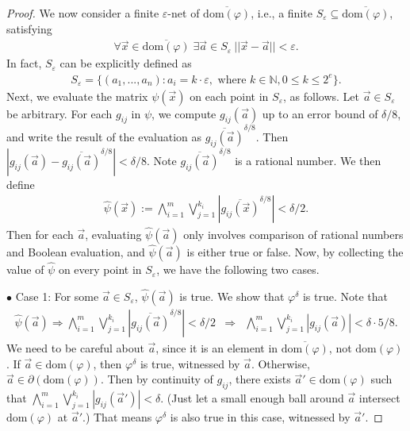 \documentclass[envcountsect]{llncs}
\newcommand{\dom}{\mathrm{dom}}
\begin{document}
\begin{proof}
We now consider a finite $\varepsilon$-net of $\overline{\dom(\varphi)}$, i.e., a finite $S_{\varepsilon} \subseteq \overline{\dom(\varphi)}$, satisfying
\begin{eqnarray}\label{two}
\forall \vec x\in \overline{\dom(\varphi)}\;\exists \vec a\in S_{\varepsilon}\ ||\vec x-\vec a||<\varepsilon. 
\end{eqnarray}
In fact, $S_{\varepsilon}$ can be explicitly defined as
\begin{eqnarray}\label{three}
S_{\varepsilon} = \{(a_1,...,a_n): a_i = k\cdot\varepsilon, \mbox{ where } k\in \mathbb{N}, 0\leq k\leq 2^e \}.
\end{eqnarray}
Next, we evaluate the matrix $\psi(\vec x)$ on each point in $S_{\varepsilon}$, as follows. Let $\vec a\in S_{\varepsilon}$ be arbitrary. For each $g_{ij}$ in $\psi$, we compute $g_{ij}(\vec a)$ up to an error bound of $\delta/8$, and write the result of the evaluation as $\overline{g_{ij}(\vec a)}^{\delta/8}$. Then $|g_{ij}(\vec a)- \overline{g_{ij}(\vec a)}^{\delta/8}|<{\delta}/{8}.$ Note $\overline{g_{ij}(\vec a)}^{\delta/8}$ is a rational number. We then define
\begin{eqnarray}
\widehat{\psi}(\vec x):= \bigwedge_{i=1}^m \bigvee_{j=1}^{k_i} |\overline{g_{ij}(\vec x)}^{\delta/8}|<\delta/2.
\end{eqnarray}
Then for each $\vec a$, evaluating $\widehat{\psi}(\vec a)$ only involves comparison of rational numbers and Boolean evaluation, and $\widehat{\psi}(\vec a)$ is either true or false. Now, by collecting the value of $\widehat{\psi}$ on every point in $S_{\varepsilon}$, we have the following two cases. 

$\bullet$ Case 1: For some $\vec a\in S_{\varepsilon}$, $\widehat{\psi}(\vec a)$ is true. We show that $\varphi^{\delta}$ is true. Note that
\begin{eqnarray*}
\widehat{\psi}(\vec a) \Rightarrow \bigwedge_{i=1}^m \bigvee_{j=1}^{k_i} |\overline{g_{ij}(\vec a)}^{\delta/8}|<\delta/2 
&\Rightarrow&\bigwedge_{i=1}^m \bigvee_{j=1}^{k_i} |g_{ij}(\vec a)|<\delta\cdot 5/8.
\end{eqnarray*}
We need to be careful about $\vec a$, since it is an element in $\overline{\dom(\varphi)}$, not $\dom(\varphi)$. If $\vec a\in \dom(\varphi)$, then $\varphi^{\delta}$ is true, witnessed by $\vec a$. Otherwise, $\vec a\in \partial(\dom(\varphi))$. Then by continuity of $g_{ij}$, there exists $\vec a'\in \dom(\varphi)$ such that $\bigwedge_{i=1}^m \bigvee_{j=1}^{k_i} |g_{ij}(\vec a')|<\delta$. (Just let a small enough ball around $\vec a$ intersect $\dom(\varphi)$ at $\vec a'$.) That means $\varphi^{\delta}$ is also true in this case, witnessed by $\vec a'$.


\end{proof}
\end{document}
